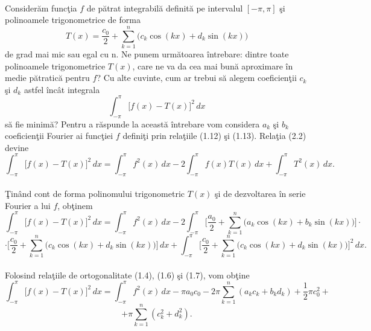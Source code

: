 \documentclass[a4paper,openany,12pt]{report}
\begin{document}
\paragraph*{}Consider\u am func\c tia $f$ de p\u atrat integrabil\u a definit\u a pe intervalul $[-\pi, \pi]$ \c si polinoamele trigonometrice de forma
\begin{equation}
T(x) = \frac{c_0}{2} + \sum_{k=1}^n \Big(c_k\cos(kx) + d_k\sin(kx)\Big)
\end{equation}
de grad mai mic sau egal cu n. Ne punem urm\u atoarea \^ intrebare: dintre toate polinoamele trigonometrice $T(x)$, care ne va da cea mai bun\u a aproximare \^ in medie p\u atratic\u a pentru $f$? Cu alte cuvinte, cum ar trebui s\u a alegem coeficien\c tii $c_k$ \c si $d_k$ astfel \^ inc\^ at integrala
\begin{equation}
\int_{-\pi}^{\pi} \Big[f(x) - T(x)\Big]^2\,dx 
\end{equation}
s\u a fie minim\u a? Pentru a r\u aspunde la aceast\u a \^ intrebare vom considera $a_k$ \c si $b_k$ coeficien\c tii Fourier ai func\c tiei $f$ defini\c ti prin rela\c tiile (1.12) \c si (1.13). Rela\c tia (2.2) devine
\begin{equation*}
\int_{-\pi}^{\pi} \Big[f(x) - T(x)\Big]^2\,dx = \int_{-\pi}^{\pi} f^2(x)\,dx - 2\int_{-\pi}^{\pi}f(x)T(x)\, dx + \int_{-\pi}^{\pi}T^2(x)\, dx.
\end{equation*}
\paragraph*{}\c Tin\^ and cont de forma polinomului trigonometric $T(x)$ \c si de dezvoltarea \^ in serie Fourier a lui $f$, ob\c tinem
\begin{equation*}
\int_{-\pi}^{\pi} \Big[f(x) - T(x)\Big]^2\,dx = \int_{-\pi}^{\pi} f^2(x)\,dx - 2\int_{-\pi}^{\pi}\Bigg[\frac{a_0}{2} + \sum_{k=1}^{n}\Big(a_k\cos(kx) + b_k\sin(kx)\Big)\Bigg]\cdot
\end{equation*}
\begin{equation*}\cdot\Bigg[\frac{c_0}{2} + \sum_{k=1}^{n}\Big(c_k\cos(kx) + d_k\sin(kx)\Big)\Bigg]\,dx + \int_{-\pi}^{\pi}\Bigg[\frac{c_0}{2} + \sum_{k=1}^{n}\Big(c_k\cos(kx) + d_k\sin(kx)\Big)\Bigg]^2\,dx.
\end{equation*}
\paragraph*{}Folosind rela\c tiile de ortogonalitate (1.4), (1.6) \c si (1.7), vom ob\c tine
\begin{equation*}
\int_{-\pi}^{\pi} \Big[f(x) - T(x)\Big]^2\,dx = \int_{-\pi}^{\pi} f^2(x)\,dx - \pi a_0 c_0 - 2\pi\sum_{k=1}^{n}(a_kc_k + b_kd_k) + \frac{1}{2}\pi c_0^2 +
\end{equation*}
 \begin{equation}
 + \pi\sum_{k=1}^{n}({c_k^2 + d_k^2}).
\end{equation}
\end{document}

